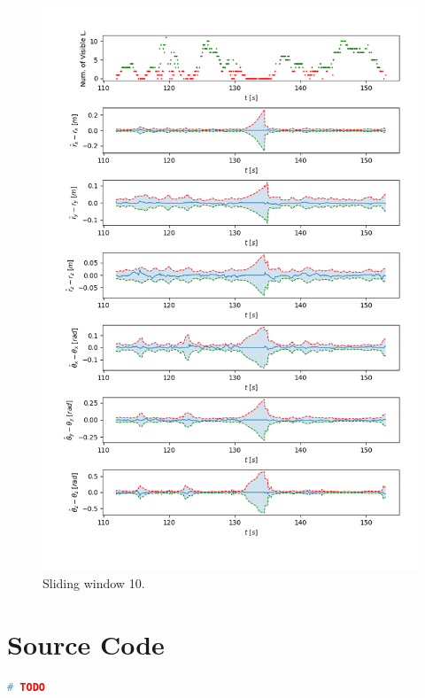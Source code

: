 \documentclass[a4paper]{article}
\begin{document}
\begin{figure}[H]
    \centering
    \includegraphics[width=\textwidth]{code/sliding_window_10.png}
    \caption{Sliding window 10.}
    \label{fig:5c}
\end{figure}


\clearpage
\printbibliography

\appendix

\clearpage
\section{Source Code}
\label{sourcecode}

\begin{lstlisting}[language=Python, basicstyle=\small]
# TODO
\end{lstlisting}
\end{document}

